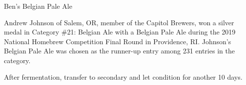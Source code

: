 \stylesection{\stylebelgianpaleale}

\begin{recipe}{Ben's Belgian Pale Ale}

\begin{aboutblock}
Andrew Johnson of Salem, OR, member of the Capitol Brewers, won a silver medal in
Category \#21: Belgian Ale with a Belgian Pale Ale during the 2019 National Homebrew
Competition Final Round in Providence, RI. Johnson's Belgian Pale Ale was chosen as
the runner-up entry among 231 entries in the category. \sourceaha
\end{aboutblock}


\begin{methodandtiming}
 
\begin{mashsteps}
\end{mashsteps}

\begin{fermentationsteps}
\end{fermentationsteps}

\begin{directions}
After fermentation, transfer to secondary and let condition for another
10 days.
\end{directions}

\end{methodandtiming}

\recipebreak

\begin{ingredientsblock}

\begin{malts}
\end{malts}

\begin{hops}
\end{hops}


\end{ingredientsblock}

\end{recipe}
